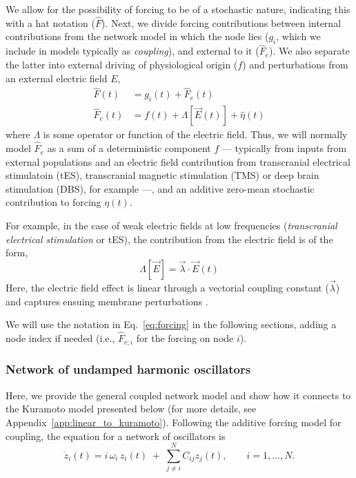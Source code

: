 \documentclass[12pt]{article}
\numberwithin{equation}{section}
\begin{document}
We allow for the possibility of forcing to be of a stochastic nature, indicating this with a hat notation  ($\hat F$).  Next, we divide forcing contributions between internal contributions from the network model in which the node lies ($g_i$, which we include in models typically as \textit{coupling}), and external to it ($\hat F_e$). We also separate the latter into external driving of physiological origin ($f$) and perturbations from an external electric field  $E$,
\begin{align} \label{eq:forcing}
    \hat F(t) &= g_{i}(t) +\hat F_e(t)\\
    \hat F_e(t)& = f(t) +   \Lambda [ \vec E(t)] + \hat \eta(t)
\end{align}
where $\Lambda$ is some operator or function of the electric field.
Thus, we will normally model $\hat F_e$ as a sum of a deterministic component  $f$ --- typically from inputs from external populations and an electric field contribution from transcranial electrical stimulatoin (tES), transcranial magnetic stimulation (TMS) or deep brain stimulation (DBS), for example ---, and an additive zero-mean stochastic contribution to forcing $\eta(t)$. 

For example, in the case of weak electric fields at low frequencies (\textit{transcranial electrical stimulation} or tES), the contribution from the electric field is of the form,
\begin{equation} \label{eq:lambda-E}
    \Lambda[\vec E] = \vec \lambda \cdot \vec E(t) 
\end{equation}
Here,  the electric field effect is linear through a vectorial coupling constant ($\vec \lambda$) and captures ensuing membrane perturbations \cite{ruffiniTranscranialCurrentBrain2013,Ruffini:2014aa,galan-gadeaSphericalHarmonicsRepresentation2023,aberraBiophysicallyRealisticNeuron2018,aberraSimulationTranscranialMagnetic2020}.  

We will use the notation in Eq.~\eqref{eq:forcing} in the following sections, adding a node index if needed (i.e., $\hat F_{e;i}$ for the forcing on node $i$).


\subsubsection{Network of  undamped harmonic oscillators}


Here, we provide the general coupled network model and show how it connects to the Kuramoto model presented below (for more details, see Appendix~\ref{app:linear_to_kuramoto}). Following the additive forcing model for coupling, the equation for a network of oscillators is 
\begin{equation}
\dot{z}_i(t)
=
  i\,\omega_i\,z_i(t)
\;+\;
 \sum_{j\neq i}^{N} C_{ij} z_j(t),
\qquad i=1,\dots,N.
\label{eq:linear_undamped_network}
\end{equation}
\end{document}
